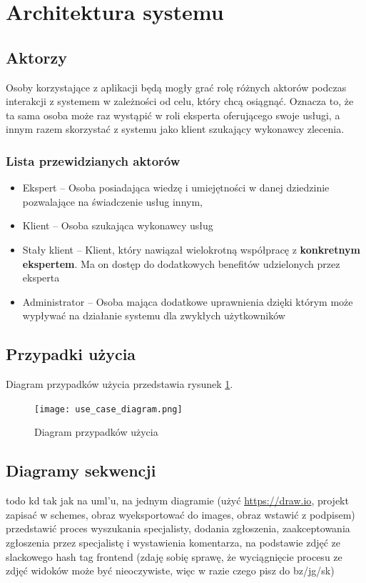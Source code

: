\documentclass[10pt, titlepage, oneside, a4paper]{article}
\begin{document}
	\section{Architektura systemu}
  
  \subsection{Aktorzy}
	Osoby korzystające z aplikacji będą mogły grać rolę różnych aktorów podczas interakcji z systemem w zależności od celu, który chcą osiągnąć.
	Oznacza to, że ta sama osoba może raz wystąpić w roli eksperta oferującego swoje usługi, a innym razem skorzystać z systemu jako klient szukający wykonawcy zlecenia.

	\subsubsection*{Lista przewidzianych aktorów}
	\begin{itemize}
		\item Ekspert -- Osoba posiadająca wiedzę i umiejętności w danej dziedzinie pozwalające na świadczenie usług innym,
		\item Klient -- Osoba szukająca wykonawcy usług
		\item Stały klient -- Klient, który nawiązał wielokrotną współpracę z \textbf{konkretnym ekspertem}. Ma on dostęp do dodatkowych benefitów udzielonych przez eksperta
		\item Administrator -- Osoba mająca dodatkowe uprawnienia dzięki którym może wypływać na działanie systemu dla zwykłych użytkowników
	\end{itemize}
	
  \subsection{Przypadki użycia}
  Diagram przypadków użycia przedstawia rysunek \ref{fig:ucDiagram}.

  \begin{figure}[h]
	  \centering
	  \texttt{[image: use\_case\_diagram.png]}
	  \caption{Diagram przypadków użycia}
	  \label{fig:ucDiagram}
  \end{figure}
  
  \subsection{Diagramy sekwencji}
	todo kd tak jak na uml'u, na jednym diagramie (użyć \url{https://draw.io}, projekt zapisać w schemes, obraz wyeksportować do images, obraz wstawić z podpisem) przedstawić proces wyszukania specjalisty, dodania zgłoszenia, zaakceptowania zgłoszenia przez specjalistę i wystawienia komentarza, na podstawie zdjęć ze slackowego hash tag frontend (zdaję sobię sprawę, że wyciągnięcie procesu ze zdjęć widoków może być nieoczywiste, więc w razie czego pisz do bz/jg/sk)
	\newpage
  
\end{document}
